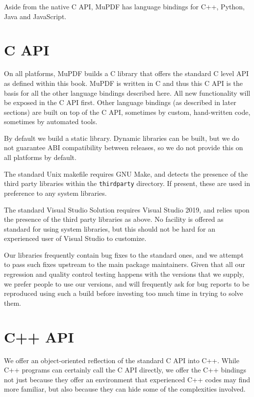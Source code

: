 \documentclass[oneside]{book}
\begin{document}
Aside from the native C API, MuPDF has language bindings for C++, Python, Java and JavaScript.

\section{C API}

On all platforms, MuPDF builds a C library that offers the standard C level API as defined within this book. MuPDF is written in C and thus this C API is the basis for all the other language bindings described here. All new functionality will be exposed in the C API first. Other language bindings (as described in later sections) are built on top of the C API, sometimes by custom, hand-written code, sometimes by automated tools.

By default we build a static library. Dynamic libraries can be built, but we do not guarantee ABI compatibility between releases, so we do not provide this on all platforms by default.

The standard Unix makefile requires GNU Make, and detects the presence of the third party libraries within the \texttt{thirdparty} directory. If present, these are used in preference to any system libraries.

The standard Visual Studio Solution requires Visual Studio 2019, and relies upon the presence of the third party libraries as above. No facility is offered as standard for using system libraries, but this should not be hard for an experienced user of Visual Studio to customize.

Our libraries frequently contain bug fixes to the standard ones, and we attempt to pass such fixes upstream to the main package maintainers. Given that all our regression and quality control testing happens with the versions that we supply, we prefer people to use our versions, and will frequently ask for bug reports to be reproduced using such a build before investing too much time in trying to solve them.

\section{C++ API}

We offer an object-oriented reflection of the standard C API into C++. While C++ programs can certainly call the C API directly, we offer the C++ bindings not just because they offer an environment that experienced C++ codes may find more familiar, but also because they can hide some of the complexities involved.
\end{document}
